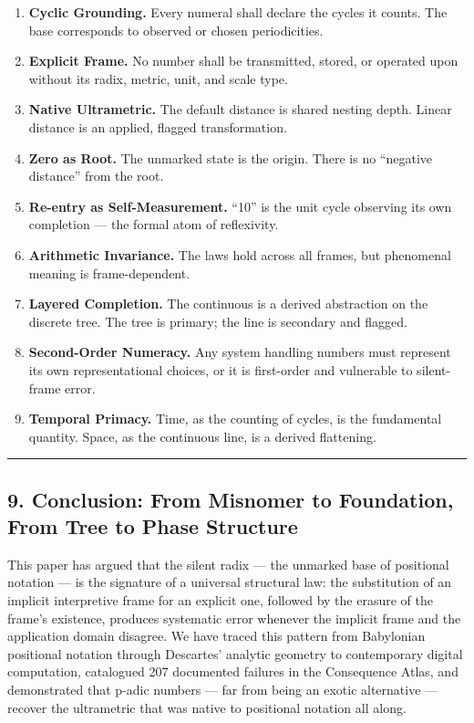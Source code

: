 \documentclass[
]{article}
\providecommand{\tightlist}{%
  \setlength{\itemsep}{0pt}\setlength{\parskip}{0pt}}
\begin{document}
\begin{enumerate}
\def\labelenumi{\arabic{enumi}.}
\tightlist
\item
  \textbf{Cyclic Grounding.} Every numeral shall declare the cycles it
  counts. The base corresponds to observed or chosen periodicities.
\item
  \textbf{Explicit Frame.} No number shall be transmitted, stored, or
  operated upon without its radix, metric, unit, and scale type.
\item
  \textbf{Native Ultrametric.} The default distance is shared nesting
  depth. Linear distance is an applied, flagged transformation.
\item
  \textbf{Zero as Root.} The unmarked state is the origin. There is no
  ``negative distance'' from the root.
\item
  \textbf{Re-entry as Self-Measurement.} ``10'' is the unit cycle
  observing its own completion --- the formal atom of reflexivity.
\item
  \textbf{Arithmetic Invariance.} The laws hold across all frames, but
  phenomenal meaning is frame-dependent.
\item
  \textbf{Layered Completion.} The continuous is a derived abstraction
  on the discrete tree. The tree is primary; the line is secondary and
  flagged.
\item
  \textbf{Second-Order Numeracy.} Any system handling numbers must
  represent its own representational choices, or it is first-order and
  vulnerable to silent-frame error.
\item
  \textbf{Temporal Primacy.} Time, as the counting of cycles, is the
  fundamental quantity. Space, as the continuous line, is a derived
  flattening.
\end{enumerate}

\begin{center}\rule{0.5\linewidth}{0.5pt}\end{center}

\subsection{9. Conclusion: From Misnomer to Foundation, From Tree to
Phase
Structure}\label{conclusion-from-misnomer-to-foundation-from-tree-to-phase-structure}

This paper has argued that the silent radix --- the unmarked base of
positional notation --- is the signature of a universal structural law:
the substitution of an implicit interpretive frame for an explicit one,
followed by the erasure of the frame's existence, produces systematic
error whenever the implicit frame and the application domain disagree.
We have traced this pattern from Babylonian positional notation through
Descartes' analytic geometry to contemporary digital computation,
catalogued 207 documented failures in the Consequence Atlas, and
demonstrated that p-adic numbers --- far from being an exotic
alternative --- recover the ultrametric that was native to positional
notation all along.
\end{document}
